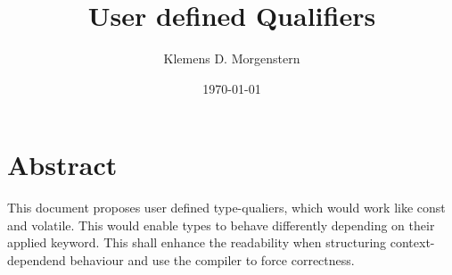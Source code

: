 \documentclass{article}
\begin{document}
\title{User defined Qualifiers}
\author{Klemens D. Morgenstern}
\date{\today}
\maketitle  
\newpage 
\tableofcontents
\newpage
\section*{Abstract}
This document proposes user defined type-qualiers, which would work like const and volatile. This would enable types to behave differently depending on their applied keyword. This shall enhance the readability when structuring context-dependend behaviour and use the compiler to force correctness.



\end{document}
